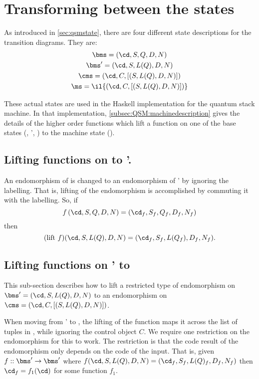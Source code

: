 \section{Transforming between the states}\label{sec:statetransforming}

As introduced in \vref{sec:qsmstate}, there are four different 
state descriptions for the transition diagrams.
They are:
\begin{gather*}
\bms = (\cd,S,Q,D,N)\\
\bms' = (\cd,S,L(Q),D,N)\\
\cms = (\cd, C , [(S,L(Q),D,N)])\\
\ms = \il{(\cd, C , [(S,L(Q),D,N)])} 
\end{gather*}

These actual states are used in the Haskell implementation for the 
quantum stack machine. In that implementation, 
\vref{subsec:QSM:machinedescription}  gives the 
details of the  higher order functions which
lift a function on one of the base states (\bms, \bms', \cms) to the 
machine state ().

\subsection{Lifting functions on \bms{} to \bms'.}\label{subsec:liftbmstobmsprime}
An endomorphism of \bms{} is changed to an endomorphism of \bms{}' by 
ignoring the labelling. That is, lifting of the endomorphism is accomplished
by commuting it
with the labelling. So, if
\[ f\,(\cd,S,Q,D,N) = (\cd_f,S_f,Q_f,D_f,N_f)\]
then 
\[ (\text{lift}\ f)(\cd,S,L(Q),D,N) = (\cd_f,S_f,L(Q_f),D_f,N_f).\]


\subsection{Lifting functions on \bms{}' to \cms}\label{subsec:liftbmstocms}
This sub-section describes how to lift a restricted type of
 endomorphism on $\bms' = (\cd,S,L(Q),D,N)$ to
an endomorphism on $\cms = (\cd, C , [(S,L(Q),D,N)])$.

When moving from \bms{}' to \cms, the lifting of the function maps it 
across the list of tuples in \cms, while ignoring the control object $C$. We
require one restriction on the endomorphism for this to work. 
The restriction is that the code result of the endomorphism 
only depends on the code of the input. That is,
given $f::\bms' \to\bms'$ where
 $f (\cd,S,L(Q),D,N) = (\cd_f,S_f,L(Q)_f,D_f,N_f) $ then
$\cd_f = f_1(\cd)$ for some function $f_1$.

